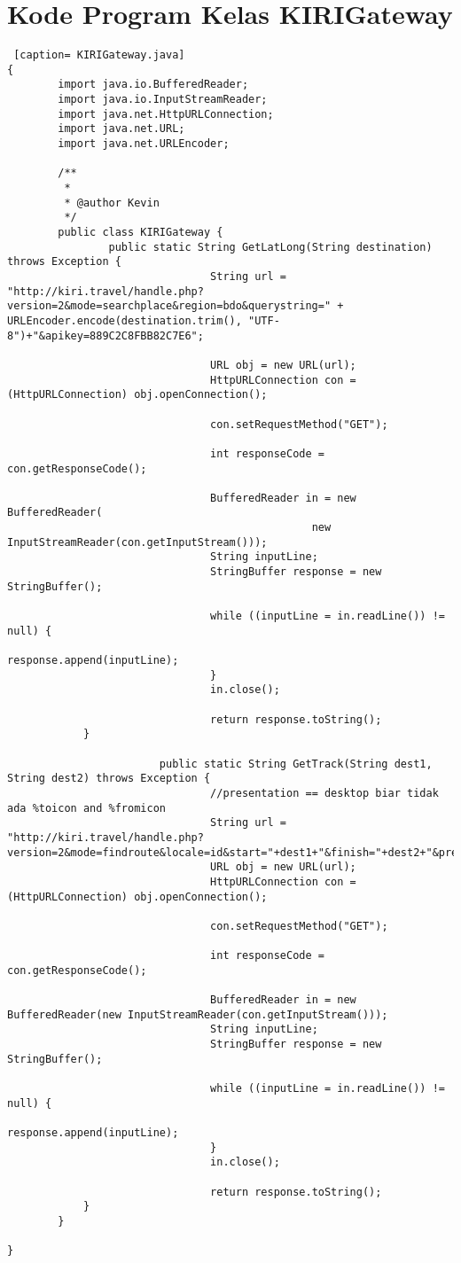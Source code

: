 \chapter{Kode Program Kelas KIRIGateway}
\label{Kode Program Kelas KIRIGateway}

\begin{lstlisting} [caption= KIRIGateway.java]
{ 
		import java.io.BufferedReader;
		import java.io.InputStreamReader;
		import java.net.HttpURLConnection;
		import java.net.URL;
		import java.net.URLEncoder;

		/**
		 *
		 * @author Kevin
		 */
		public class KIRIGateway {
				public static String GetLatLong(String destination) throws Exception {
								String url = "http://kiri.travel/handle.php?version=2&mode=searchplace&region=bdo&querystring=" + URLEncoder.encode(destination.trim(), "UTF-8")+"&apikey=889C2C8FBB82C7E6";

								URL obj = new URL(url);
								HttpURLConnection con = (HttpURLConnection) obj.openConnection();

								con.setRequestMethod("GET");

								int responseCode = con.getResponseCode();

								BufferedReader in = new BufferedReader(
												new InputStreamReader(con.getInputStream()));
								String inputLine;
								StringBuffer response = new StringBuffer();

								while ((inputLine = in.readLine()) != null) {
												response.append(inputLine);
								}
								in.close();

								return response.toString();
			}
						
						public static String GetTrack(String dest1, String dest2) throws Exception {
								//presentation == desktop biar tidak ada %toicon and %fromicon
								String url = "http://kiri.travel/handle.php?version=2&mode=findroute&locale=id&start="+dest1+"&finish="+dest2+"&presentation=desktop&apikey=889C2C8FBB82C7E6";
								URL obj = new URL(url);
								HttpURLConnection con = (HttpURLConnection) obj.openConnection();

								con.setRequestMethod("GET");

								int responseCode = con.getResponseCode();

								BufferedReader in = new BufferedReader(new InputStreamReader(con.getInputStream()));
								String inputLine;
								StringBuffer response = new StringBuffer();

								while ((inputLine = in.readLine()) != null) {
												response.append(inputLine);
								}
								in.close();

								return response.toString();
			}
		}

}
\end{lstlisting}